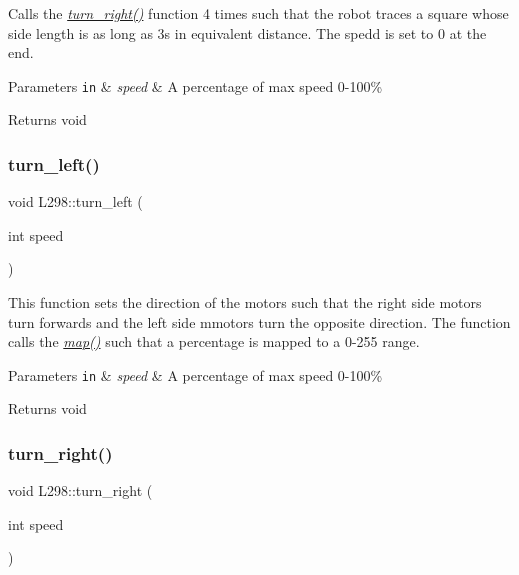 Calls the {\itshape \hyperlink{classL298_a96b6c3c4a52195343bc19d05aa1efffd}{turn\+\_\+right()}} function 4 times such that the robot traces a square whose side length is as long as 3s in equivalent distance. The spedd is set to 0 at the end. 
\begin{DoxyParams}[1]{Parameters}
\mbox{\tt in}  & {\em speed} & A percentage of max speed 0-\/100\% \\
\hline
\end{DoxyParams}
\begin{DoxyReturn}{Returns}
void 
\end{DoxyReturn}
\mbox{\label{classL298_a430051b0786596aac92f747121e9535c}} 
\subsubsection{\texorpdfstring{turn\+\_\+left()}{turn\_left()}}
{\footnotesize\ttfamily void L298\+::turn\+\_\+left (\begin{DoxyParamCaption}\item[{int}]{speed }\end{DoxyParamCaption})}

This function sets the direction of the motors such that the right side motors turn forwards and the left side mmotors turn the opposite direction. The function calls the {\itshape \hyperlink{classL298_a937f021c405806051271c7ca4ab81fe2}{map()}} such that a percentage is mapped to a 0-\/255 range. 
\begin{DoxyParams}[1]{Parameters}
\mbox{\tt in}  & {\em speed} & A percentage of max speed 0-\/100\% \\
\hline
\end{DoxyParams}
\begin{DoxyReturn}{Returns}
void 
\end{DoxyReturn}
\mbox{\label{classL298_a96b6c3c4a52195343bc19d05aa1efffd}} 
\subsubsection{\texorpdfstring{turn\+\_\+right()}{turn\_right()}}
{\footnotesize\ttfamily void L298\+::turn\+\_\+right (\begin{DoxyParamCaption}\item[{int}]{speed }\end{DoxyParamCaption})}

